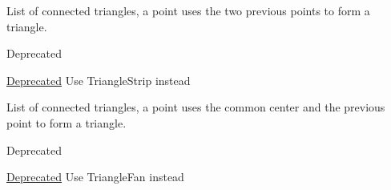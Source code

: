 \begin{Desc}
\begin{description}
\item[{\em 
\hypertarget{group__graphics_gga5ee56ac1339984909610713096283b1baf5ef0ffa5d13f9ea3e0eb18a2a8da7fb}{Triangles\-Strip}\label{group__graphics_gga5ee56ac1339984909610713096283b1baf5ef0ffa5d13f9ea3e0eb18a2a8da7fb}
}]List of connected triangles, a point uses the two previous points to form a triangle. \begin{DoxyRefDesc}{Deprecated}
\item[\hyperlink{deprecated__deprecated000003}{Deprecated}]Use Triangle\-Strip instead \end{DoxyRefDesc}
\item[{\em 
\hypertarget{group__graphics_gga5ee56ac1339984909610713096283b1ba698ecd8ec938b4132412b8da44a1a6be}{Triangles\-Fan}\label{group__graphics_gga5ee56ac1339984909610713096283b1ba698ecd8ec938b4132412b8da44a1a6be}
}]List of connected triangles, a point uses the common center and the previous point to form a triangle. \begin{DoxyRefDesc}{Deprecated}
\item[\hyperlink{deprecated__deprecated000004}{Deprecated}]Use Triangle\-Fan instead \end{DoxyRefDesc}
\end{description}
\end{Desc}
